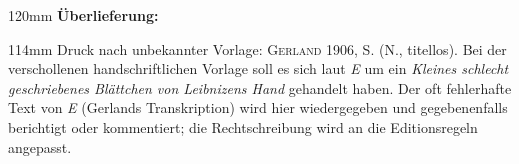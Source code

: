 %
\frenchspacing%
\begin{ledgroupsized}[r]{120mm}%
\footnotesize%
\pstart%
\noindent%
\textbf{Überlieferung:}%
\pend%
\end{ledgroupsized}%
\begin{ledgroupsized}[r]{114mm}%
\footnotesize%
\pstart%
\parindent -6mm%
%
Druck nach unbekannter Vorlage:
\textsc{Gerland} 1906, S. (N., titellos).%
\cite{00197}
Bei der verschollenen handschriftlichen Vorlage soll es sich laut \textit{E} um ein \textit{Kleines schlecht geschriebenes Blättchen von Leibnizens Hand} gehandelt haben.
Der oft fehlerhafte Text von \textit{E} (Gerlands Transkription) wird hier wiedergegeben und gegebenenfalls berichtigt oder kommentiert; die Rechtschreibung wird an die Editionsregeln angepasst.
\pend%
\end{ledgroupsized}%
\vspace{5mm}%
